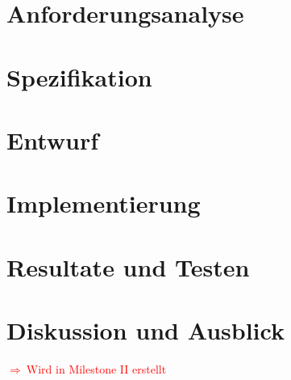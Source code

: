 \documentclass[12pt,a4paper]{scrartcl}
\newcommand{\todo}[1]{\begin{Large}\textcolor{red}{$\Rightarrow ~$#1}\end{Large}}
\begin{document}
\section{Anforderungsanalyse}


\section{Spezifikation}


\section{Entwurf}

\section{Implementierung}

\section{Resultate und Testen}

\section{Diskussion und Ausblick}
\todo{Wird in Milestone II erstellt}
\end{document}
